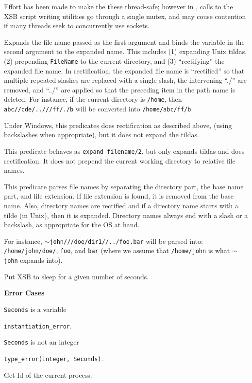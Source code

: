 Effort has been made to make the these thread-safe; however in
\version, calls to the XSB script writing utilities go through a
single mutex, and may couse contention if many threads seek to
concurrently use sockets.

\begin{description}
%
Expands the file name passed as the first argument and binds the
variable in the second argument to the expanded name. This includes
(1) expanding Unix tildas, (2) prepending {\tt FileName} to the
current directory, and (3) ``rectifying'' the expanded file name.  In
rectification, the expanded file name is ``rectified'' so that
multiple repeated slashes are replaced with a single slash, the
intervening ``./'' are removed, and ``../'' are applied so that the
preceding item in the path name is deleted. For instance, if the
current directory is {\tt /home}, then {\tt abc//cde/..///ff/./b} will
be converted into {\tt /home/abc/ff/b}.

Under Windows, this predicates does rectification as described above,
(using backslashes when appropriate), but it does not expand the
tildas.

This predicate behaves as {\tt expand\_filename/2}, but only expands
tildas and does rectification. It does not prepend the current working
directory to relative file names.

This predicate parses file names by separating the directory part, the base
name part, and file extension. If file extension is found, it is removed
from the base name. Also, directory names are rectified and if a directory
name starts with a tilde (in Unix), then it is expanded. Directory names
always end with a slash or a backslash, as appropriate for the OS at hand.

For instance, {\tt $\sim$john///doe/dir1//../foo.bar} will be parsed into:
{\tt /home/john/doe/}, {\tt foo}, and {\tt bar} (where we assume that    
{\tt /home/john} is what {\tt $\sim$john} expands into).  

Put XSB to sleep for a given number of seconds.

{\bf Error Cases}
\bi
\item 	{\tt Seconds} is a variable
\bi
\item 	{\tt instantiation\_error}.
\ei
\item 	{\tt Seconds} is not an integer
\bi
\item 	{\tt type\_error(integer, Seconds)}.
\ei
\ei

Get Id of the current process.

\end{description}

